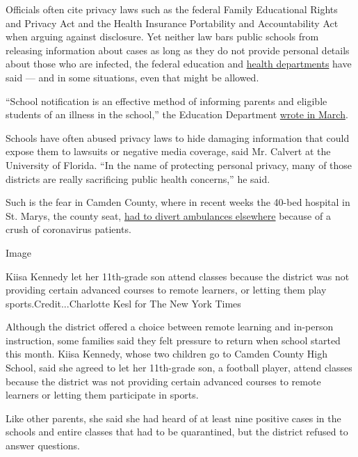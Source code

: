 Officials often cite privacy laws such as the federal Family Educational
Rights and Privacy Act and the Health Insurance Portability and
Accountability Act when arguing against disclosure. Yet neither law bars
public schools from releasing information about cases as long as they do
not provide personal details about those who are infected, the federal
education and
\href{https://www.hhs.gov/hipaa/for-professionals/faq/513/does-hipaa-apply-to-an-elementary-school/index.html}{health
departments} have said --- and in some situations, even that might be
allowed.

``School notification is an effective method of informing parents and
eligible students of an illness in the school,'' the Education
Department
\href{https://studentprivacy.ed.gov/sites/default/files/resource_document/file/FERPA\%20and\%20Coronavirus\%20Frequently\%20Asked\%20Questions_0.pdf}{wrote
in March}.

Schools have often abused privacy laws to hide damaging information that
could expose them to lawsuits or negative media coverage, said Mr.
Calvert at the University of Florida. ``In the name of protecting
personal privacy, many of those districts are really sacrificing public
health concerns,'' he said.

Such is the fear in Camden County, where in recent weeks the 40-bed
hospital in St. Marys, the county seat,
\href{https://thebrunswicknews.com/news/local_news/hospital-using-ambulances-as-extra-emergency-space/article_2af5be1e-364d-57d6-aded-4ff80b415708.html}{had
to divert ambulances elsewhere} because of a crush of coronavirus
patients.

Image

Kiisa Kennedy let her 11th-grade son attend classes because the district
was not providing certain advanced courses to remote learners, or
letting them play sports.Credit...Charlotte Kesl for The New York Times

Although the district offered a choice between remote learning and
in-person instruction, some families said they felt pressure to return
when school started this month. Kiisa Kennedy, whose two children go to
Camden County High School, said she agreed to let her 11th-grade son, a
football player, attend classes because the district was not providing
certain advanced courses to remote learners or letting them participate
in sports.

Like other parents, she said she had heard of at least nine positive
cases in the schools and entire classes that had to be quarantined, but
the district refused to answer questions.

